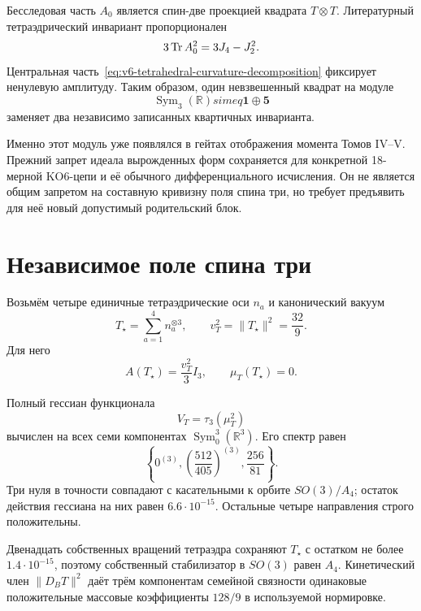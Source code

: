 Бесследовая часть $A_0$ является спин-две проекцией квадрата $T\otimes T$.
Литературный тетраэдрический инвариант пропорционален
\begin{equation}
 3\operatorname{Tr} A_0^2=3J_4-J_2^2.
\end{equation}
Центральная часть~\eqref{eq:v6-tetrahedral-curvature-decomposition}
фиксирует ненулевую амплитуду. Таким образом, один невзвешенный квадрат на
модуле
\begin{equation}
 \operatorname{Sym}_3(\mathbb R)simeq\mathbf1\oplus\mathbf5
\end{equation}
заменяет два независимо записанных квартичных инварианта.

Именно этот модуль уже появлялся в гейтах отображения момента Томов IV--V.
Прежний запрет идеала вырожденных форм сохраняется для конкретной
18-мерной KO6-цепи и её обычного дифференциального исчисления. Он не
является общим запретом на составную кривизну поля спина три, но требует
предъявить для неё новый допустимый родительский блок.

\section{Независимое поле спина три}

Возьмём четыре единичные тетраэдрические оси $n_a$ и канонический вакуум
\begin{equation}
 T_\star=\sum_{a=1}^4n_a^{\otimes3},
 \qquad
 v_T^2=\|T_\star\|^2=\frac{32}{9}.
 \label{eq:v6-tetrahedral-spin-three-vacuum}
\end{equation}
Для него
\begin{equation}
 A(T_\star)=\frac{v_T^2}{3}I_3,
 \qquad
 \mu_T(T_\star)=0.
\end{equation}

Полный гессиан функционала
\begin{equation}
 V_T=\tau_3(\mu_T^2)
 \label{eq:v6-independent-tetrahedral-potential}
\end{equation}
вычислен на всех семи компонентах $\operatorname{Sym}^3_0(\mathbb R^3)$.
Его спектр равен
\begin{equation}
 \left\{
 0^{(3)},
 \left(\frac{512}{405}\right)^{(3)},
 \frac{256}{81}
 \right\}.
 \label{eq:v6-independent-tetrahedral-hessian}
\end{equation}
Три нуля в точности совпадают с касательными к орбите $SO(3)/A_4$;
остаток действия гессиана на них равен $6.6\cdot10^{-15}$. Остальные
четыре направления строго положительны.

Двенадцать собственных вращений тетраэдра сохраняют $T_\star$ с остатком
не более $1.4\cdot10^{-15}$, поэтому собственный стабилизатор в $SO(3)$
равен $A_4$. Кинетический член $\|D_BT\|^2$ даёт трём компонентам
семейной связности одинаковые положительные массовые коэффициенты
$128/9$ в используемой нормировке.

